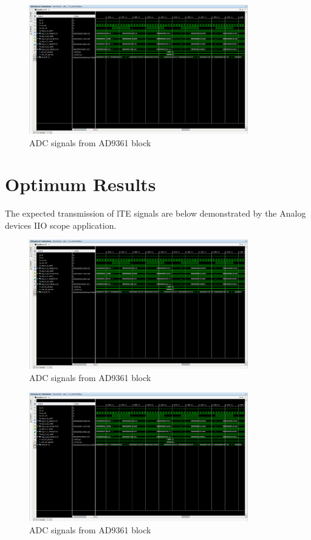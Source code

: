 \begin{figure}[htbp]
    \centering
    \includegraphics[width=0.85\textwidth]{./figures/adcInterface}
    \caption{ ADC signals from AD9361 block
    \label{fig:adcsignals}}
\end{figure}

\section{Optimum Results}
\label{result:optimum}

The expected transmission of lTE signals are below demonstrated by the Analog
devices IIO scope application.

\begin{figure}[htbp]
    \centering
    \includegraphics[width=0.85\textwidth]{./figures/adcInterface}
    \caption{ ADC signals from AD9361 block
    \label{fig:adcsignals}}
\end{figure}

\begin{figure}[htbp]
    \centering
    \includegraphics[width=0.85\textwidth]{./figures/adcInterface}
    \caption{ ADC signals from AD9361 block
    \label{fig:adcsignals}}
\end{figure}

